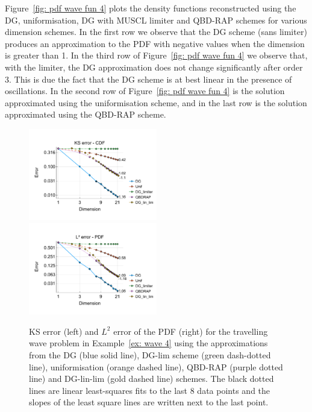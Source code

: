 \begin{example}
Figure~\ref{fig: pdf wave fun 4} plots the density functions reconstructed using the DG, uniformisation, DG with MUSCL limiter and QBD-RAP schemes for various dimension schemes. In the first row we observe that the DG scheme (sans limiter) produces an approximation to the PDF with negative values when the dimension is greater than 1. In the third row of Figure~\ref{fig: pdf wave fun 4} we observe that, with the limiter, the DG approximation does not change significantly after order 3. This is due the fact that the DG scheme is at best linear in the presence of oscillations. In the second row of Figure~\ref{fig: pdf wave fun 4} is the solution approximated using the uniformisation scheme, and in the last row is the solution approximated using the QBD-RAP scheme. 
\begin{figure}[h]
	\centering
	\includegraphics[width=0.5\textwidth,trim={0.75cm 0.8cm 0.25cm 1.25cm},clip]{chapter6/figs/wave/fun4/meshs_ks_error_formatted.pdf}%
	\includegraphics[width=0.5\textwidth,trim={0.75cm 0.8cm 0.25cm 1.25cm},clip]{chapter6/figs/wave/fun4/meshs_l2_pdf_error_formatted.pdf}
	\caption{KS error (left) and \(L^2\) error of the PDF (right) for the travelling wave problem in Example~\ref{ex: wave 4} using the approximations from the DG (blue solid line), DG-lim scheme (green dash-dotted line), uniformisation (orange dashed line), QBD-RAP (purple dotted line) and DG-lin-lim (gold dashed line) schemes. The black dotted lines are linear least-squares fits to the last 8 data points and the slopes of the least square lines are written next to the last point.} 
	\label{fig: fun 4 wave} 
\end{figure}

\end{example}
